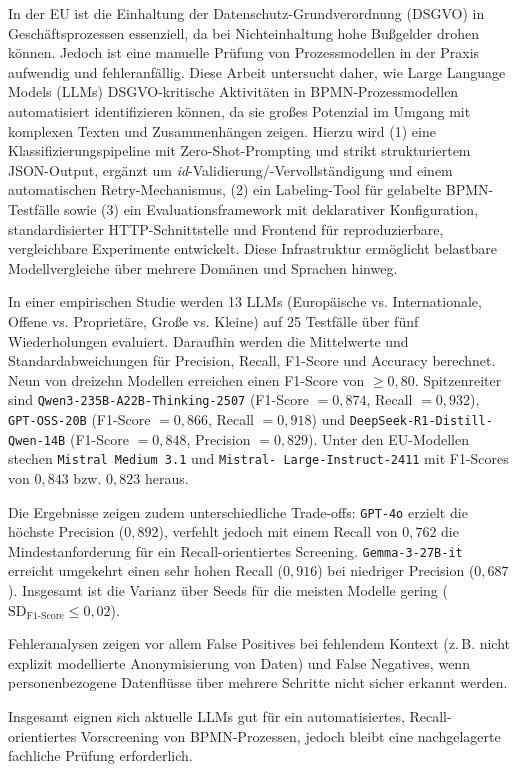 \documentclass[a4paper,12pt,
headsepline,           %
oneside,               %
pointlessnumbers,      %
bibtotoc,              %
BCOR15mm               %
]{scrbook}
\newenvironment{abstract}{}{}
\begin{document}
\begin{abstract}
    In der EU ist die Einhaltung der Datenschutz-Grundverordnung (DSGVO) in Geschäftsprozessen essenziell, da bei Nichteinhaltung hohe Bußgelder drohen können. Jedoch ist eine manuelle Prüfung von Prozessmodellen in der Praxis aufwendig und fehleranfällig. Diese Arbeit untersucht daher, wie Large Language Models (LLMs) DSGVO-kritische Aktivitäten in BPMN-Prozessmodellen automatisiert identifizieren können, da sie großes Potenzial im Umgang mit komplexen Texten und Zusammenhängen zeigen. Hierzu wird (1) eine Klassifizierungspipeline mit Zero-Shot-Prompting und strikt strukturiertem JSON-Output, ergänzt um \emph{id}-Validierung/-Vervollständigung und einem automatischen Retry-Mechanismus, (2) ein Labeling-Tool für gelabelte BPMN-Testfälle sowie (3) ein Evaluationsframework mit deklarativer Konfiguration, standardisierter HTTP-Schnittstelle und Frontend für reproduzierbare, vergleichbare Experimente entwickelt. Diese Infrastruktur ermöglicht belastbare Modellvergleiche über mehrere Domänen und Sprachen hinweg.

    In einer empirischen Studie werden 13 LLMs (Europäische vs. Internationale, Offene vs. Proprietäre, Große vs. Kleine) auf 25 Testfälle über fünf Wiederholungen evaluiert. Daraufhin werden die Mittelwerte und Standardabweichungen für Precision, Recall, F1-Score und Accuracy berechnet. Neun von dreizehn Modellen erreichen einen F1-Score von $\ge 0{,}80$. Spitzenreiter sind \texttt{Qwen3-235B-A22B-Thinking-2507} (F1-Score $=0{,}874$, Recall $=0{,}932$), \texttt{GPT-OSS-20B} (F1-Score $=0{,}866$, Recall $=0{,}918$) und \texttt{DeepSeek-R1-Distill-Qwen-14B} (F1-Score $=0{,}848$, Precision $=0{,}829$). Unter den EU-Modellen stechen \texttt{Mistral Medium 3.1} und \texttt{Mistral-\linebreak~Large-Instruct-2411} mit F1-Scores von $0{,}843$ bzw. $0{,}823$ heraus.

    Die Ergebnisse zeigen zudem unterschiedliche Trade-offs: \texttt{GPT-4o} erzielt die höchste Precision ($0{,}892$), verfehlt jedoch mit einem Recall von $0{,}762$ die Mindestanforderung für ein Recall-orientiertes Screening. \texttt{Gemma-3-27B-it} erreicht umgekehrt einen sehr hohen Recall ($0{,}916$) bei niedriger Precision ($0{,}687$). Insgesamt ist die Varianz über Seeds für die meisten Modelle gering ($\text{SD}_{\text{F1-Score}}\le 0{,}02$).

    Fehleranalysen zeigen vor allem False Positives bei fehlendem Kontext (z.\,B. nicht explizit modellierte Anonymisierung von Daten) und False Negatives, wenn personenbezogene Datenflüsse über mehrere Schritte nicht sicher erkannt werden.

    Insgesamt eignen sich aktuelle LLMs gut für ein automatisiertes, Recall-orientiertes Vorscreening von BPMN-Prozessen, jedoch bleibt eine nachgelagerte fachliche Prüfung erforderlich.
\end{abstract}
\end{document}

